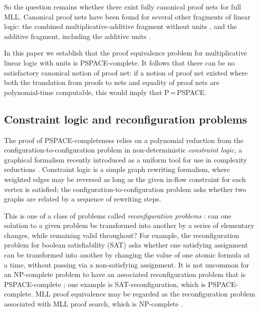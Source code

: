 \documentclass{sigplanconf}
\let\aftersubsection=\noindent
\let\capsabbrev=\uppercase
\begin{document}
So the question remains whether there exist fully canonical proof nets for full \capsabbrev{mll}. Canonical proof nets have been found for several other fragments of linear logic: the combined multiplicative-additive fragment without units \cite{Hughes-vanGlabbeek-2005}, and the additive fragment, including the additive units \cite{Heijltjes-2011}.

In this paper we establish that the proof equivalence problem for multiplicative linear logic with units is \capsabbrev{pspace}-complete. It follows that there can be no satisfactory canonical notion of proof net: 
\color{red}
if a notion of proof net existed where both the translation from proofs to nets and equality of proof nets are polynomial-time computable, this would imply that \capsabbrev{p}\,=\,\capsabbrev{pspace}.
\color{black}



\subsection*{Constraint logic and reconfiguration problems}

\aftersubsection
The proof of \capsabbrev{pspace}-completeness relies on a polynomial reduction from the configuration-to-configuration problem in non-deterministic
\emph{constraint logic}, a graphical formalism recently introduced as a uniform tool for use in complexity reductions \cite{Demaine-Hearn-2008}.
%
Constraint logic is a simple graph rewriting formalism, where weighted edges may be reversed as long as the given in-flow constraint for each vertex is satisfied; the configuration-to-configuration problem asks whether two graphs are related by a sequence of rewriting steps.

This is one of a class of problems called \emph{reconfiguration problems} \cite{ReconfigurationProblems}: can one solution to a given problem be transformed into another by a series of elementary changes, while remaining valid throughout?
%
For example, the reconfiguration problem for boolean satisfiability (SAT) asks whether one satisfying assignment can be transformed into another by changing the value of one atomic formula at a time, without passing via a non-satisfying assignment.
%
It is not uncommon for an \capsabbrev{np}-complete problem to have an associated reconfiguration problem that is \capsabbrev{pspace}-complete \cite{ReconfigurationProblems}; one example is SAT-reconfiguration, which is \capsabbrev{pspace}-complete. \capsabbrev{mll} proof equivalence may be regarded as the reconfiguration problem associated with \capsabbrev{mll} proof search, which is \capsabbrev{np}-complete \cite{Kanovich-1992,Lincoln-Winkler-1994}.
\end{document}
